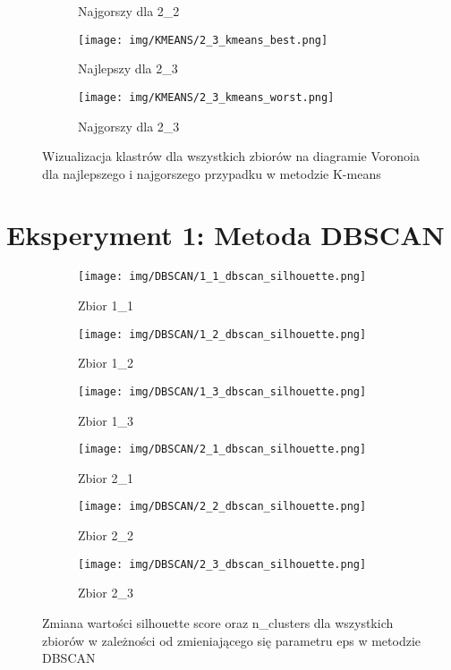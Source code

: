 \documentclass[12pt]{article}
\begin{document}
\begin{figure}[H]
\begin{subfigure}[b]{0.24\textwidth}
        \caption{Najgorszy dla 2\_2}
    \end{subfigure}
    \hfill
    \begin{subfigure}[b]{0.24\textwidth}
        \texttt{[image: img/KMEANS/2\_3\_kmeans\_best.png]}
        \caption{Najlepszy dla 2\_3}
    \end{subfigure}
    \hfill
    \begin{subfigure}[b]{0.24\textwidth}
        \texttt{[image: img/KMEANS/2\_3\_kmeans\_worst.png]}
        \caption{Najgorszy dla 2\_3}
    \end{subfigure}
    \caption{\centering Wizualizacja klastrów dla wszystkich zbiorów na diagramie Voronoia dla najlepszego i najgorszego przypadku w metodzie K-means}
\end{figure}


\newpage
\section{Eksperyment 1: Metoda DBSCAN}
\begin{figure}[H]
    \centering
    \begin{subfigure}[b]{0.3\textwidth}
        \texttt{[image: img/DBSCAN/1\_1\_dbscan\_silhouette.png]}
        \caption{Zbior 1\_1}
    \end{subfigure}
    \hfill
    \begin{subfigure}[b]{0.3\textwidth}
        \texttt{[image: img/DBSCAN/1\_2\_dbscan\_silhouette.png]}
        \caption{Zbior 1\_2}
    \end{subfigure}
    \hfill
    \begin{subfigure}[b]{0.3\textwidth}
        \texttt{[image: img/DBSCAN/1\_3\_dbscan\_silhouette.png]}
        \caption{Zbior 1\_3}
    \end{subfigure}
    \begin{subfigure}[b]{0.3\textwidth}
        \texttt{[image: img/DBSCAN/2\_1\_dbscan\_silhouette.png]}
        \caption{Zbior 2\_1}
    \end{subfigure}
    \hfill
    \begin{subfigure}[b]{0.3\textwidth}
        \texttt{[image: img/DBSCAN/2\_2\_dbscan\_silhouette.png]}
        \caption{Zbior 2\_2}
    \end{subfigure}
    \hfill
    \begin{subfigure}[b]{0.3\textwidth}
        \texttt{[image: img/DBSCAN/2\_3\_dbscan\_silhouette.png]}
        \caption{Zbior 2\_3}
    \end{subfigure}
    \caption{\centering Zmiana wartości silhouette score oraz n\_clusters dla wszystkich zbiorów w zależności od zmieniającego się parametru eps w metodzie DBSCAN}
\end{figure}
\end{document}
